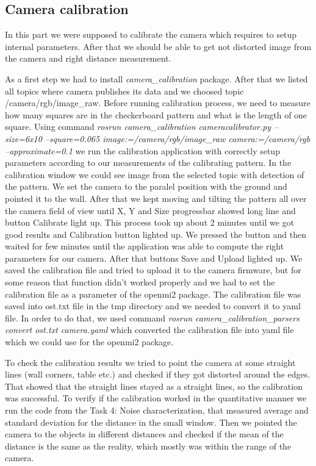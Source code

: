 \documentclass[11pt]{article}
\begin{document}
\subsection{Camera calibration}
 
	In this part we were supposed to calibrate the camera which requires to setup internal parameters. After that we should be able to get not distorted image from the camera and right distance measurement. \par
	As a first step we had to install \emph{camera_calibration} package. After that we listed all topics where camera publishes its data and we choosed topic /camera/rgb/image_raw. Before running calibration process, we need to measure how many squares are in the checkerboard pattern and what is the length of one square. Using command \emph{rosrun camera_calibration cameracalibrator.py --size=6x10 --square=0.065 image:=/camera/rgb/image_raw camera:=/camera/rgb --approximate=0.1} we run the calibration application with correctly setup parameters according to our measurements of the calibrating pattern. In the calibration window we could see image from the selected topic with detection of the pattern. We set the camera to the paralel position with the ground and pointed it to the wall. After that we kept moving and tilting the pattern all over the camera field of view until X, Y and Size progressbar showed long line and button Calibrate light up. This process took up about 2 minutes until we got good results and Calibration button lighted up. We pressed the button and then waited for few minutes until the application was able to compute the right parameters for our camera. After that buttons Save and Upload lighted up. We saved the calibration file and tried to upload it to the camera firmware, but for some reason that function didn't worked properly and we had to set the calibration file as a parameter of the openmi2 package. The calibration file was saved into ost.txt file in the tmp directory and we needed to convert it to yaml file. In order to do that, we used command \emph{rosrun camera_calibration_parsers convert  ost.txt camera.yaml} which converted the calibration file into yaml file which we could use for the openmi2 package. \par
	To check the calibration results we tried to point the camera at some straight lines (wall corners, table etc.) and checked if they got distorted around the edges. That showed that the straight lines stayed as a straight lines, so the calibration was successful. To verify if the calibration worked in the quantitative manner we run the code from the Task 4: Noise characterization, that measured average and standard deviation for the distance in the small window. Then we pointed the camera to the objects in different distances and checked if the mean of the distance is the same as the reality, which mostly was within the range of the camera. \par
	
\end{document}
